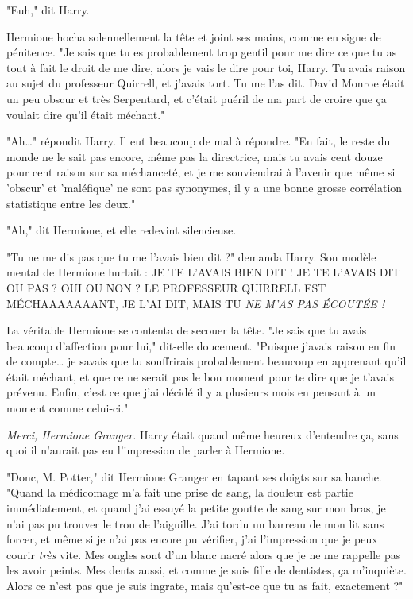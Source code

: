 "Euh," dit Harry.

Hermione hocha solennellement la tête et joint ses mains, comme en signe de pénitence. "Je sais que tu es probablement trop gentil pour me dire ce que tu as tout à fait le droit de me dire, alors je vais le dire pour toi, Harry. Tu avais raison au sujet du professeur Quirrell, et j'avais tort. Tu me l'as dit. David Monroe était un peu obscur et très Serpentard, et c'était puéril de ma part de croire que ça voulait dire qu'il était méchant."

"Ah…" répondit Harry. Il eut beaucoup de mal à répondre. "En fait, le reste du monde ne le sait pas encore, même pas la directrice, mais tu avais cent douze pour cent raison sur sa méchanceté, et je me souviendrai à l'avenir que même si 'obscur' et 'maléfique' ne sont pas synonymes, il y a une bonne grosse corrélation statistique entre les deux."

"Ah," dit Hermione, et elle redevint silencieuse.

"Tu ne me dis pas que tu me l'avais bien dit ?" demanda Harry. Son modèle mental de Hermione hurlait : JE TE L'AVAIS BIEN DIT ! JE TE L'AVAIS DIT OU PAS ? OUI OU NON ? LE PROFESSEUR QUIRRELL EST MÉCHAAAAAAANT, JE L'AI DIT, MAIS TU \emph{NE M'AS PAS ÉCOUTÉE !} 

La véritable Hermione se contenta de secouer la tête. "Je sais que tu avais beaucoup d'affection pour lui," dit-elle doucement. "Puisque j'avais raison en fin de compte… je savais que tu souffrirais probablement beaucoup en apprenant qu'il était méchant, et que ce ne serait pas le bon moment pour te dire que je t'avais prévenu. Enfin, c'est ce que j'ai décidé il y a plusieurs mois en pensant à un moment comme celui-ci."

\emph{Merci, Hermione Granger.}  Harry était quand même heureux d'entendre ça, sans quoi il n'aurait pas eu l'impression de parler à Hermione.

"Donc, M. Potter," dit Hermione Granger en tapant ses doigts sur sa hanche. "Quand la médicomage m'a fait une prise de sang, la douleur est partie immédiatement, et quand j'ai essuyé la petite goutte de sang sur mon bras, je n'ai pas pu trouver le trou de l'aiguille. J'ai tordu un barreau de mon lit sans forcer, et même si je n'ai pas encore pu vérifier, j'ai l'impression que je peux courir \emph{très}  vite. Mes ongles sont d'un blanc nacré alors que je ne me rappelle pas les avoir peints. Mes dents aussi, et comme je suis fille de dentistes, ça m'inquiète. Alors ce n'est pas que je suis ingrate, mais qu'est-ce que tu as fait, exactement ?"

